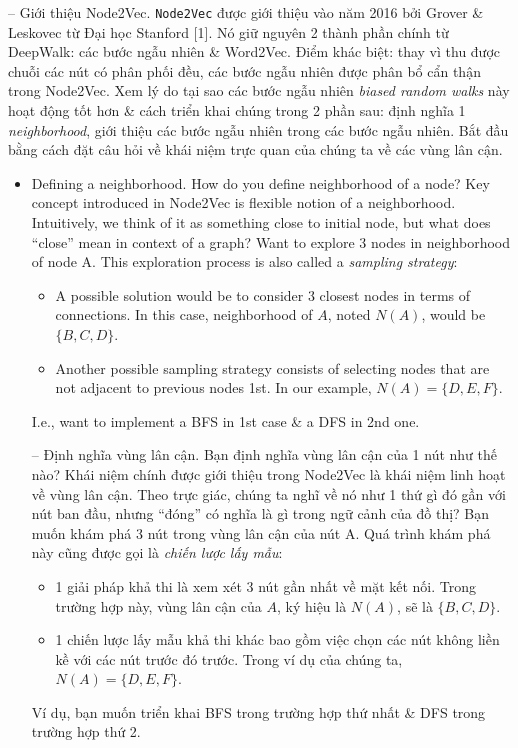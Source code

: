 \documentclass{article}
\begin{document}
\begin{itemize}
\begin{itemize}
        -- {\sf Giới thiệu Node2Vec.} {\tt Node2Vec} được giới thiệu vào năm 2016 bởi {\sc Grover \& Leskovec} từ Đại học Stanford [1]. Nó giữ nguyên 2 thành phần chính từ DeepWalk: các bước ngẫu nhiên \& Word2Vec. Điểm khác biệt: thay vì thu được chuỗi các nút có phân phối đều, các bước ngẫu nhiên được phân bổ cẩn thận trong Node2Vec. Xem lý do tại sao các bước ngẫu nhiên {\it biased random walks} này hoạt động tốt hơn \& cách triển khai chúng trong 2 phần sau: định nghĩa 1 {\it neighborhood}, giới thiệu các bước ngẫu nhiên trong các bước ngẫu nhiên. Bắt đầu bằng cách đặt câu hỏi về khái niệm trực quan của chúng ta về các vùng lân cận.
        \begin{itemize}
            \item {\sf Defining a neighborhood.} How do you define neighborhood of a node? Key concept introduced in Node2Vec is flexible notion of a neighborhood. Intuitively, we think of it as something close to initial node, but what does ``close'' mean in context of a graph? Want to explore 3 nodes in neighborhood of node A. This exploration process is also called a {\it sampling strategy}:
            \begin{itemize}
                \item A possible solution would be to consider 3 closest nodes in terms of connections. In this case, neighborhood of $A$, noted $N(A)$, would be $\{B,C,D\}$.
                \item Another possible sampling strategy consists of selecting nodes that are not adjacent to previous nodes 1st. In our example, $N(A) = \{D,E,F\}$.
            \end{itemize}
            I.e., want to implement a BFS in 1st case \& a DFS in 2nd one.

            -- {\sf Định nghĩa vùng lân cận.} Bạn định nghĩa vùng lân cận của 1 nút như thế nào? Khái niệm chính được giới thiệu trong Node2Vec là khái niệm linh hoạt về vùng lân cận. Theo trực giác, chúng ta nghĩ về nó như 1 thứ gì đó gần với nút ban đầu, nhưng ``đóng'' có nghĩa là gì trong ngữ cảnh của đồ thị? Bạn muốn khám phá 3 nút trong vùng lân cận của nút A. Quá trình khám phá này cũng được gọi là {\it chiến lược lấy mẫu}:
            \begin{itemize}
                \item 1 giải pháp khả thi là xem xét 3 nút gần nhất về mặt kết nối. Trong trường hợp này, vùng lân cận của $A$, ký hiệu là $N(A)$, sẽ là $\{B,C,D\}$.
                \item 1 chiến lược lấy mẫu khả thi khác bao gồm việc chọn các nút không liền kề với các nút trước đó trước. Trong ví dụ của chúng ta, $N(A) = \{D,E,F\}$.
            \end{itemize}
            Ví dụ, bạn muốn triển khai BFS trong trường hợp thứ nhất \& DFS trong trường hợp thứ 2.


\end{itemize}
\end{itemize}
\end{itemize}
\end{document}
